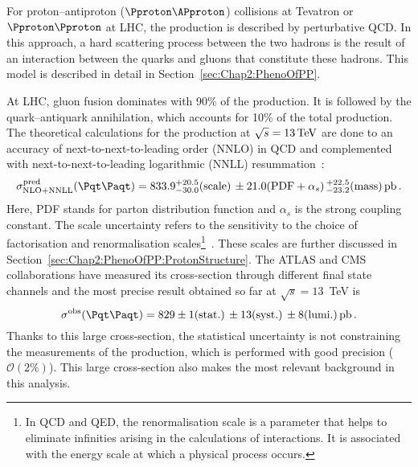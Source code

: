 For proton--antiproton ($\Pproton \APproton$) collisions at Tevatron or $\Pproton \Pproton$ at LHC, the \ttbar production is described by
perturbative QCD.  In this approach, a hard scattering process between the two hadrons is the result 
of an interaction between the quarks and gluons that constitute these hadrons. This model is described in detail in 
Section~\ref{sec:Chap2:PhenoOfPP}.


At LHC, gluon fusion dominates with 90\% of 
the \ttbar production. It is followed by the quark--antiquark annihilation, 
which accounts for 10\% of the total \ttbar production.
The theoretical calculations for the \ttbar 
production at $\sqrt{s}=13\,\text{TeV}$ are done to an accuracy of  next-to-next-to-leading order (NNLO)
in QCD and complemented with next-to-next-to-leading logarithmic (NNLL) resummation~\cite{Czakon_2020, Czakon:2013goa}: %
\begin{equation*}
\sigma^{\text{pred}}_{\text{NLO+NNLL}}(\ttbar) = 833.9^{+20.5}_{-30.0}\text{(scale)}\,\pm 21.0 \text{(PDF}+\alpha_{s}) \, ^{+22.5}_{-23.2}\text{(mass)}\,\text{pb}\,. 
\end{equation*}
Here, PDF stands for parton distribution function and $\alpha_{s}$ is the strong coupling constant.
The scale uncertainty refers to the sensitivity to the choice of factorisation and renormalisation 
scales\footnote{In QCD and QED, the renormalisation scale is a parameter that helps 
to eliminate infinities arising in the calculations of  interactions. It is associated with the 
energy scale at which a physical process occurs.}~\cite{Czakon:2016dgf}. 
These scales are further discussed in Section~\ref{sec:Chap2:PhenoOfPP:ProtonStructure}.
The ATLAS and CMS collaborations have measured its cross-section through different final state channels and 
the most precise result obtained so far at $\sqrt{s}=13$~TeV is~\cite{ATLAS:2023gsl} 
\begin{equation*}
\sigma^{\text{obs}} (\ttbar) = 829 \pm 1\text{(stat.)}\,\pm 13\text{(syst.)}\,\pm 8\text{(lumi.)}\, \text{pb} \, .
\end{equation*}
Thanks to this large cross-section, the statistical uncertainty is not constraining the measurements of
the \ttbar production, which is performed with good precision ($\mathcal{O}(2\%)$).
This large cross-section also makes \ttbar the most relevant background in this analysis.


